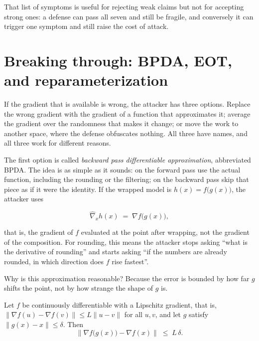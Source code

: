 That list of symptoms is useful for rejecting weak claims but not for accepting strong ones: a defense
can pass all seven and still be fragile, and conversely it can trigger one symptom and still raise the
cost of attack.


\section{Breaking through: BPDA, EOT, and reparameterization}

If the gradient that is available is wrong, the attacker has three options. Replace the wrong
gradient with the gradient of a function that approximates it; average the gradient over the
randomness that makes it change; or move the work to another space, where the defense obfuscates
nothing. All three have names, and all three work for different reasons.

The first option is called \emph{backward pass differentiable approximation}, abbreviated
BPDA. The idea is as simple as it sounds: on the forward pass use the actual function,
including the rounding or the filtering; on the backward pass skip that piece as if
it were the identity. If the wrapped model is $h(x)=f\bigl(g(x)\bigr)$,
the attacker uses

\begin{equation}
\widehat{\nabla}_x h(x) \;=\; \nabla f\bigl(g(x)\bigr),
\end{equation}

that is, the gradient of $f$ evaluated at the point after wrapping, not the gradient of the
composition. For rounding, this means the attacker stops asking ``what is the derivative of
rounding'' and starts asking ``if the numbers are already rounded, in which direction does $f$
rise fastest''.

Why is this approximation reasonable? Because the error is bounded by how far $g$
shifts the point, not by how strange the shape of $g$ is.

\begin{proposisi}
Let $f$ be continuously differentiable with a Lipschitz gradient, that is,
$\lVert \nabla f(u)-\nabla f(v)\rVert \le L\lVert u-v\rVert$ for all $u,v$, and
let $g$ satisfy $\lVert g(x)-x\rVert\le\delta$. Then
\begin{equation}
\bigl\lVert \nabla f\bigl(g(x)\bigr)-\nabla f(x)\bigr\rVert \;\le\; L\,\delta .
\end{equation}
\end{proposisi}

